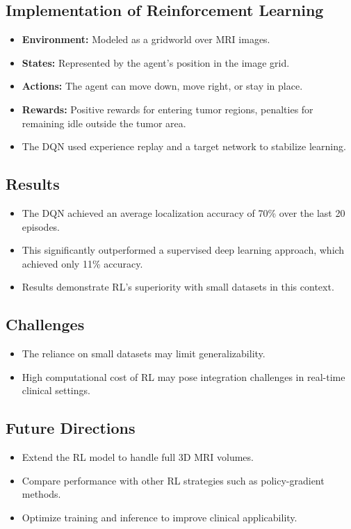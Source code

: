 \subsection*{Implementation of Reinforcement Learning}
\begin{itemize}
    \item \textbf{Environment:} Modeled as a gridworld over MRI images.
    \item \textbf{States:} Represented by the agent's position in the image grid.
    \item \textbf{Actions:} The agent can move down, move right, or stay in place.
    \item \textbf{Rewards:} Positive rewards for entering tumor regions, penalties for remaining idle outside the tumor area.
    \item The DQN used experience replay and a target network to stabilize learning.
\end{itemize}

\subsection*{Results}
\begin{itemize}
    \item The DQN achieved an average localization accuracy of 70\% over the last 20 episodes.
    \item This significantly outperformed a supervised deep learning approach, which achieved only 11\% accuracy.
    \item Results demonstrate RL’s superiority with small datasets in this context.
\end{itemize}

\subsection*{Challenges}
\begin{itemize}
    \item The reliance on small datasets may limit generalizability.
    \item High computational cost of RL may pose integration challenges in real-time clinical settings.
\end{itemize}

\subsection*{Future Directions}
\begin{itemize}
    \item Extend the RL model to handle full 3D MRI volumes.
    \item Compare performance with other RL strategies such as policy-gradient methods.
    \item Optimize training and inference to improve clinical applicability.
\end{itemize}


